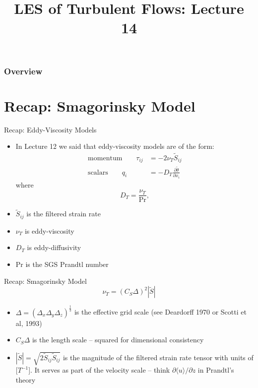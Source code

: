  
\title{LES of Turbulent Flows: Lecture 14}




\begin{frame} 
  \titlepage
\end{frame}


\begin{frame}
\frametitle{Overview}
\tableofcontents
\end{frame}

\section{Recap: Smagorinsky Model} %
\begin{frame}{Recap: Eddy-Viscosity Models}
\begin{itemize}
	\item In Lecture 12 we said that eddy-viscosity models are of the form:
	\begin{align*}
		\text{momentum} \qquad \tau_{ij} &= -2\nu_{T} \widetilde{S}_{ij}\\
		\text{scalars} \qquad q_i &= -D_T \frac{\partial \widetilde{\theta}}{\partial x_i}
	\end{align*}
	where
	$$D_T = \frac{\nu_T}{\text{Pr}},$$
	\item $\widetilde{S}_{ij}$ is the filtered strain rate
	\item $\nu_T$ is eddy-viscosity
	\item $D_T$ is eddy-diffusivity
	\item Pr is the SGS Prandtl number 
\end{itemize}

\end{frame}


\begin{frame}{Recap: Smagorinsky Model}
$$\nu_T = (C_S \Delta)^2 | \widetilde{S}|$$

\begin{itemize}
	\item $\Delta = (\Delta_x \Delta_y \Delta_z)^{\frac{1}{3}}$ is the effective grid scale (see Deardorff 1970 or Scotti et al, 1993)
	\item $C_S \Delta$ is the length scale -- squared for dimensional consistency
	\item $|\widetilde{S}| = \sqrt{2\widetilde{S}_{ij}\widetilde{S}_{ij}}$ is the magnitude of the filtered strain rate tensor with units of [$T^{-1}$]. It serves as part of the velocity scale -- think $\partial \langle u \rangle / \partial z$ in Prandtl's theory
\end{itemize}

\end{frame}

